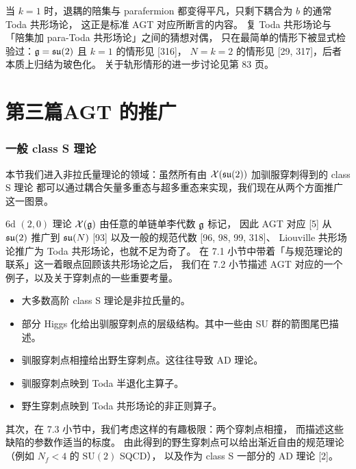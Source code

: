 当 $k=1$ 时，退耦的陪集与 parafermion 都变得平凡，只剩下耦合为 $b$ 的通常 Toda 共形场论，
这正是标准 AGT 对应所断言的内容。
复 Toda 共形场论与「陪集加 para-Toda 共形场论」之间的猜想对偶，
只在最简单的情形下被显式检验过：$\mathfrak{g}=\mathfrak{su}(2)$ 且 $k=1$ 的情形见 [316]，
$N=k=2$ 的情形见 [29, 317]，后者本质上归结为玻色化。
关于轨形情形的进一步讨论见第 83 页。

\part{第三篇\quad AGT 的推广}

\section{一般 class S 理论}

本节我们进入非拉氏量理论的领域：虽然所有由 $\mathcal{X}(\mathfrak{su}(2))$ 加驯服穿刺得到的 class S 理论
都可以通过耦合矢量多重态与超多重态来实现，我们现在从两个方面推广这一图景。

6d $(2,0)$ 理论 $\mathcal{X}(\mathfrak{g})$ 由任意的单链单李代数 $\mathfrak{g}$ 标记，
因此 AGT 对应 [5] 从 $\mathfrak{su}(2)$ 推广到 $\mathfrak{su}(N)$ [93] 以及一般的规范代数 [96, 98, 99, 318]、
Liouville 共形场论推广为 Toda 共形场论，也就不足为奇了。
在 7.1 小节中带着「与规范理论的联系」这一着眼点回顾该共形场论之后，
我们在 7.2 小节描述 AGT 对应的一个例子，以及关于穿刺点的一些重要考量。

\begin{keyboxplain}
\begin{itemize}[leftmargin=1.4em,itemsep=1pt,topsep=1pt]
\item 大多数高阶 class S 理论是非拉氏量的。
\item 部分 Higgs 化给出驯服穿刺点的层级结构。其中一些由 SU 群的箭图尾巴描述。
\item 驯服穿刺点相撞给出野生穿刺点。这往往导致 AD 理论。
\item 驯服穿刺点映到 Toda 半退化主算子。
\item 野生穿刺点映到 Toda 共形场论的非正则算子。
\end{itemize}
\end{keyboxplain}

其次，在 7.3 小节中，我们考虑这样的有趣极限：两个穿刺点相撞，
而描述这些缺陷的参数作适当的标度。
由此得到的野生穿刺点可以给出渐近自由的规范理论（例如 $N_f<4$ 的 $\mathrm{SU}(2)$ SQCD），
以及作为 class S 一部分的 AD 理论 [2]。


